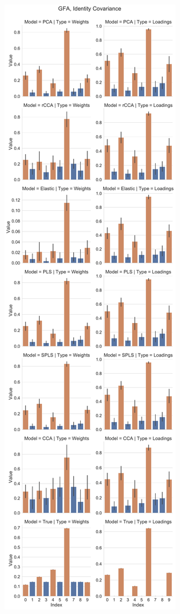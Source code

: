\begin{figure}
\centering
\begin{subfigure}{0.49\linewidth}
\centering
\includegraphics[width=\linewidth]{figures/simulated/low/Combined_Weights_Loadings_with_Error_Bars_Identity_Covariance_explicit}

\end{subfigure}
\end{figure}

